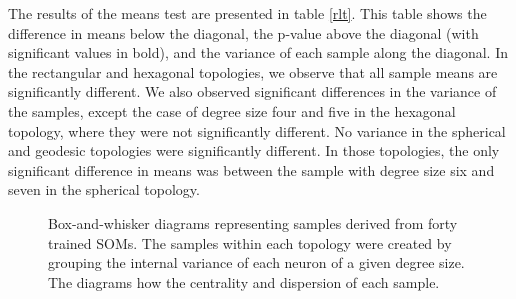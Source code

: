 \begin{table}[htb]
\begin{minipage}{\textwidth}
\end{minipage}\end{table}

The results of the means test are presented in table \ref{rlt}. This table
shows the difference in means below the diagonal, the p-value above the
diagonal (with significant values in bold), and the variance of each
sample along the diagonal.  In the rectangular and hexagonal topologies, we
observe that all sample means are significantly different.  We also observed
significant differences in the variance of the samples, except the case of
degree size four and five in the hexagonal topology, where they were not
significantly different. No variance in the spherical and geodesic topologies
were significantly different.  In those topologies, the only significant
difference in means was between the sample with degree size six and seven in
the spherical topology.

\begin{figure}
\centering
{}
\caption{Box-and-whisker diagrams representing samples derived from forty
trained SOMs.  The samples within each topology were created by grouping the
internal variance of each neuron of a given degree size. The diagrams how the
centrality and dispersion of each sample.}
\label{boxplot}
\end{figure}


